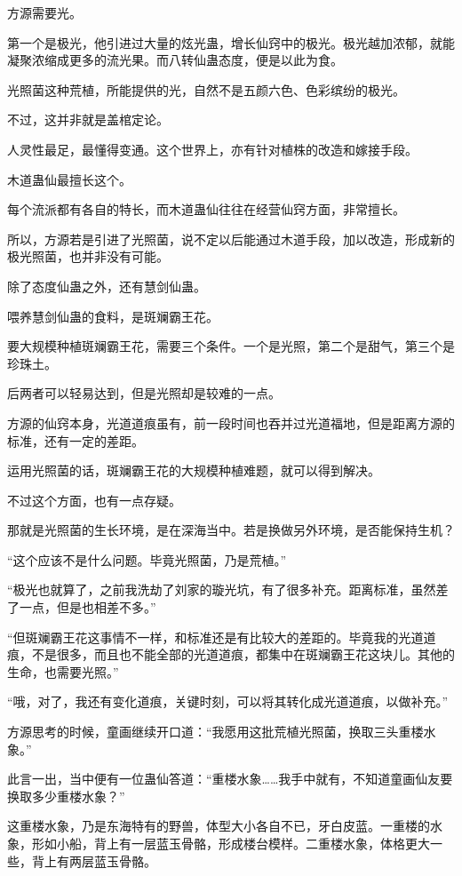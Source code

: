 
\begin{this_body}

方源需要光。

第一个是极光，他引进过大量的炫光蛊，增长仙窍中的极光。极光越加浓郁，就能凝聚浓缩成更多的流光果。而八转仙蛊态度，便是以此为食。

光照菌这种荒植，所能提供的光，自然不是五颜六色、色彩缤纷的极光。

不过，这并非就是盖棺定论。

人灵性最足，最懂得变通。这个世界上，亦有针对植株的改造和嫁接手段。

木道蛊仙最擅长这个。

每个流派都有各自的特长，而木道蛊仙往往在经营仙窍方面，非常擅长。

所以，方源若是引进了光照菌，说不定以后能通过木道手段，加以改造，形成新的极光照菌，也并非没有可能。

除了态度仙蛊之外，还有慧剑仙蛊。

喂养慧剑仙蛊的食料，是斑斓霸王花。

要大规模种植斑斓霸王花，需要三个条件。一个是光照，第二个是甜气，第三个是珍珠土。

后两者可以轻易达到，但是光照却是较难的一点。

方源的仙窍本身，光道道痕虽有，前一段时间也吞并过光道福地，但是距离方源的标准，还有一定的差距。

运用光照菌的话，斑斓霸王花的大规模种植难题，就可以得到解决。

不过这个方面，也有一点存疑。

那就是光照菌的生长环境，是在深海当中。若是换做另外环境，是否能保持生机？

“这个应该不是什么问题。毕竟光照菌，乃是荒植。”

“极光也就算了，之前我洗劫了刘家的璇光坑，有了很多补充。距离标准，虽然差了一点，但是也相差不多。”

“但斑斓霸王花这事情不一样，和标准还是有比较大的差距的。毕竟我的光道道痕，不是很多，而且也不能全部的光道道痕，都集中在斑斓霸王花这块儿。其他的生命，也需要光照。”

“哦，对了，我还有变化道痕，关键时刻，可以将其转化成光道道痕，以做补充。”

方源思考的时候，童画继续开口道：“我愿用这批荒植光照菌，换取三头重楼水象。”

此言一出，当中便有一位蛊仙答道：“重楼水象……我手中就有，不知道童画仙友要换取多少重楼水象？”

这重楼水象，乃是东海特有的野兽，体型大小各自不已，牙白皮蓝。一重楼的水象，形如小船，背上有一层蓝玉骨骼，形成楼台模样。二重楼水象，体格更大一些，背上有两层蓝玉骨骼。


\end{this_body}
